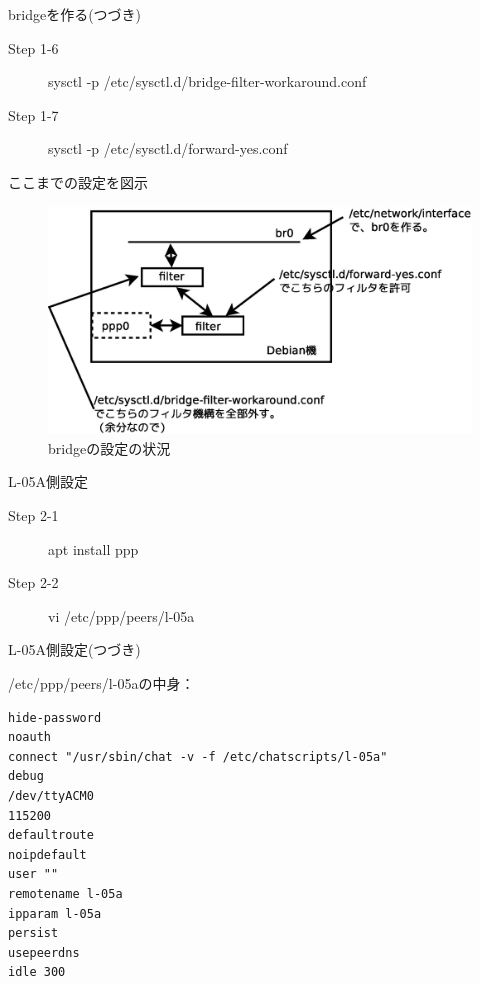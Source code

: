 \begin{frame}{bridgeを作る(つづき)}

  \begin{description}
  \item [Step 1-6] sysctl -p /etc/sysctl.d/bridge-filter-workaround.conf
  \item [Step 1-7] sysctl -p /etc/sysctl.d/forward-yes.conf
　\end{description}
\end{frame}

\begin{frame}{ここまでの設定を図示}

\begin{figure}[htbp]
\includegraphics[width=0.8\hsize]{image201512/bridge.eps}
\caption{bridgeの設定の状況}
\end{figure}
  
\end{frame}

\begin{frame}{L-05A側設定}

  \begin{description}
    \item [Step 2-1] apt install ppp
    \item [Step 2-2] vi /etc/ppp/peers/l-05a
  \end{description}      
\end{frame}

\begin{frame}[containsverbatim]{L-05A側設定(つづき)}

 /etc/ppp/peers/l-05aの中身：
\begin{verbatim}
hide-password 
noauth 
connect "/usr/sbin/chat -v -f /etc/chatscripts/l-05a"
debug 
/dev/ttyACM0
115200
defaultroute
noipdefault 
user ""
remotename l-05a
ipparam l-05a
persist 
usepeerdns 
idle 300
\end{verbatim}
  
\end{frame}

